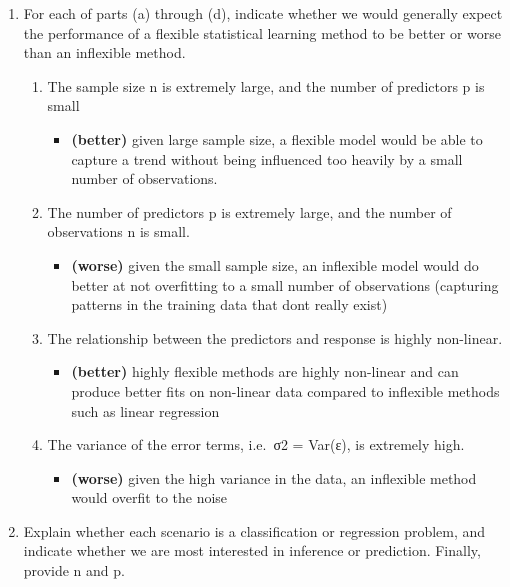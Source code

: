 \documentclass[]{book}
\providecommand{\tightlist}{%
  \setlength{\itemsep}{0pt}\setlength{\parskip}{0pt}}
\theoremstyle{definition}
\theoremstyle{definition}
\theoremstyle{definition}
\theoremstyle{remark}
\begin{document}
\begin{enumerate}
\def\labelenumi{\arabic{enumi}.}
\tightlist
\item
  For each of parts (a) through (d), indicate whether we would generally
  expect the performance of a flexible statistical learning method to be
  better or worse than an inflexible method.

  \begin{enumerate}
  \def\labelenumii{(\alph{enumii})}
  \tightlist
  \item
    The sample size n is extremely large, and the number of predictors p
    is small

    \begin{itemize}
    \tightlist
    \item
      \textbf{(better)} given large sample size, a flexible model would
      be able to capture a trend without being influenced too heavily by
      a small number of observations.
    \end{itemize}
  \item
    The number of predictors p is extremely large, and the number of
    observations n is small.

    \begin{itemize}
    \tightlist
    \item
      \textbf{(worse)} given the small sample size, an inflexible model
      would do better at not overfitting to a small number of
      observations (capturing patterns in the training data that dont
      really exist)
    \end{itemize}
  \item
    The relationship between the predictors and response is highly
    non-linear.

    \begin{itemize}
    \tightlist
    \item
      \textbf{(better)} highly flexible methods are highly non-linear
      and can produce better fits on non-linear data compared to
      inflexible methods such as linear regression
    \end{itemize}
  \item
    The variance of the error terms, i.e.~σ2 = Var(ε), is extremely
    high.

    \begin{itemize}
    \tightlist
    \item
      \textbf{(worse)} given the high variance in the data, an
      inflexible method would overfit to the noise
    \end{itemize}
  \end{enumerate}
\item
  Explain whether each scenario is a classification or regression
  problem, and indicate whether we are most interested in inference or
  prediction. Finally, provide n and p.
\end{enumerate}
\end{document}
